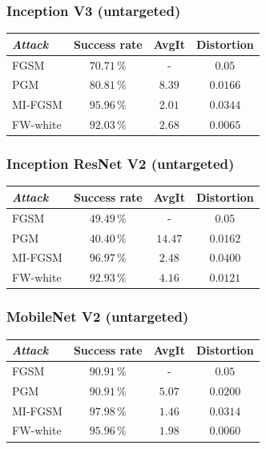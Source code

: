 \documentclass[10pt,twocolumn,letterpaper, english]{article}
\theoremstyle{definition}
\theoremstyle{plain}
\theoremstyle{plain}
\theoremstyle{plain}
\theoremstyle{plain}
\theoremstyle{remark}
\theoremstyle{remark}
\theoremstyle{definition}
\theoremstyle{definition}
\theoremstyle{definition}
\theoremstyle{definition}
\begin{document}
\subsubsection{Inception V3 (untargeted)}

\begin{center}

\begin{tabular}{ |l|c|c|c| }
 \hline
  \textit{Attack} & Success rate & AvgIt & Distortion \\
 \hline
 
 FGSM   & $70.71\,\%$   &  - & $0.05$\\
 PGM&   $80.81\,\%$  & $8.39$  & $0.0166$ \\
 MI-FGSM & $95.96\,\%$ & $2.01$ & $0.0344$\\
 FW-white & $92.03\,\%$ & $2.68$ & $0.0065$\\
\hline
\end{tabular}
\end{center}


\subsubsection{Inception ResNet V2 (untargeted)}

\begin{center}
    

\begin{tabular}{ |l|c|c|c| }
 \hline
  \textit{Attack} & Success rate & AvgIt & Distortion \\
 \hline
 
 FGSM   & $49.49\,\%$   &  - & $0.05$\\
 PGM&   $40.40\,\%$  & $14.47$  & $0.0162$ \\
 MI-FGSM & $96.97\,\%$ & $2.48$ & $0.0400$\\
 FW-white & $92.93\,\%$ & $4.16$ & $0.0121$\\
\hline
\end{tabular}
\end{center}

\subsubsection{MobileNet V2 (untargeted)}

\begin{center}
    
\begin{tabular}{ |l|c|c|c| }
 \hline
  \textit{Attack} & Success rate & AvgIt & Distortion \\
 \hline
 
 FGSM   & $90.91\,\%$   &  - & $0.05$\\
 PGM&   $90.91\,\%$  & $5.07$  & $0.0200$ \\
 MI-FGSM & $97.98\,\%$ & $1.46$ & $0.0314$\\
 FW-white & $95.96\,\%$ & $1.98$ & $0.0060$\\
\hline
\end{tabular}
\end{center}
\end{document}
